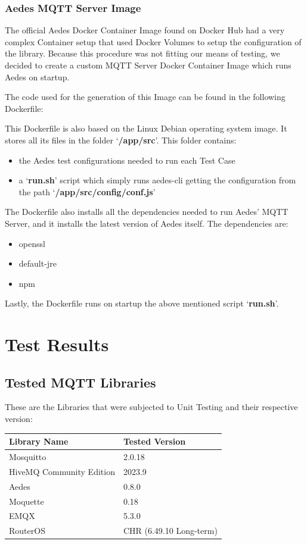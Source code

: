 \documentclass[binding=0.6cm,noexaminfo]{sapthesis}
\begin{document}
\subsection{Aedes MQTT Server Image}
The official Aedes Docker Container Image found on Docker Hub had a very complex Container setup that used Docker Volumes to setup the configuration of the library. Because this procedure was not fitting our means of testing, we decided to create a custom MQTT Server Docker Container Image which runs Aedes on startup.

The code used for the generation of this Image can be found in the following Dockerfile:


This Dockerfile is also based on the Linux Debian operating system image. It stores all its files in the folder `\textbf{/app/src}'. This folder contains:
\begin{itemize}
	\item the Aedes test configurations needed to run each Test Case
	\item a `\textbf{run.sh}' script which simply runs aedes-cli getting the configuration from the path `\textbf{/app/src/config/conf.js}'
\end{itemize}
The Dockerfile also installs all the dependencies needed to run Aedes' MQTT Server, and it installs the latest version of Aedes itself.
The dependencies are:
\begin{itemize}
	\item openssl
	\item default-jre
	\item npm
\end{itemize}
Lastly, the Dockerfile runs on startup the above mentioned script `\textbf{run.sh}'.

\chapter{Test Results}
\section{Tested MQTT Libraries}
These are the Libraries that were subjected to Unit Testing and their respective version:

\begin{center}
\begin{tabular}{| p{6cm} | p{6cm} |}
\hline
\textbf{Library Name} & \textbf{Tested Version} \\
\hline
Mosquitto & 2.0.18 \\
\hline
HiveMQ Community Edition & 2023.9 \\
\hline
Aedes & 0.8.0 \\
\hline
Moquette & 0.18 \\
\hline
EMQX & 5.3.0 \\
\hline
RouterOS & CHR (6.49.10 Long-term) \\
\hline
\end{tabular}
\end{center}
\end{document}
